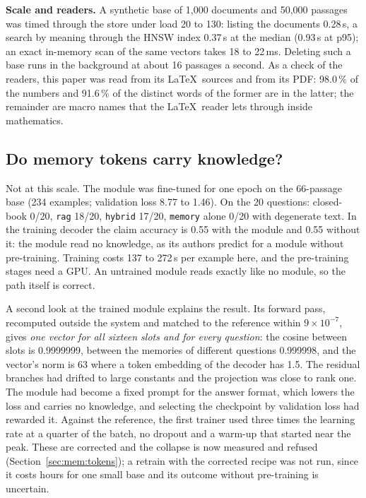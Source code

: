 \textbf{Scale and readers.} A synthetic base of 1{,}000 documents and 50{,}000
passages was timed through the store under load 20 to 130: listing the
documents 0.28\,s, a search by meaning through the HNSW index 0.37\,s at the
median (0.93\,s at p95); an exact in-memory scan of the same vectors takes 18
to 22\,ms. Deleting such a base runs in the background at about 16 passages a
second. As a check of the readers, this paper was read from its \LaTeX\
sources and from its PDF: 98.0\,\% of the numbers and 91.6\,\% of the distinct
words of the former are in the latter; the remainder are macro names that the
\LaTeX\ reader lets through inside mathematics.

\subsection{Do memory tokens carry knowledge?}
\label{sec:eval:memory}
Not at this scale. The module was fine-tuned for one epoch on the 66-passage
base (234 examples; validation loss 8.77 to 1.46). On the 20 questions:
closed-book 0/20, \texttt{rag} 18/20, \texttt{hybrid} 17/20, \texttt{memory}
alone 0/20 with degenerate text. In the training decoder the claim accuracy is
0.55 with the module and 0.55 without it: the module read no knowledge, as its
authors predict for a module without pre-training. Training costs 137 to
272\,s per example here, and the pre-training stages need a GPU. An untrained
module reads exactly like no module, so the path itself is correct.

A second look at the trained module explains the result. Its forward pass,
recomputed outside the system and matched to the reference within
$9\times10^{-7}$, gives \emph{one vector for all sixteen slots and for every
question}: the cosine between slots is 0.9999999, between the memories of
different questions 0.999998, and the vector's norm is 63 where a token
embedding of the decoder has 1.5. The residual branches had drifted to large
constants and the projection was close to rank one. The module had become a
fixed prompt for the answer format, which lowers the loss and carries no
knowledge, and selecting the checkpoint by validation loss had rewarded it.
Against the reference, the first trainer used three times the learning rate
at a quarter of the batch, no dropout and a warm-up that started near the
peak. These are corrected and the collapse is now measured and refused
(Section~\ref{sec:mem:tokens}); a retrain with the corrected recipe was not
run, since it costs hours for one small base and its outcome without
pre-training is uncertain.

